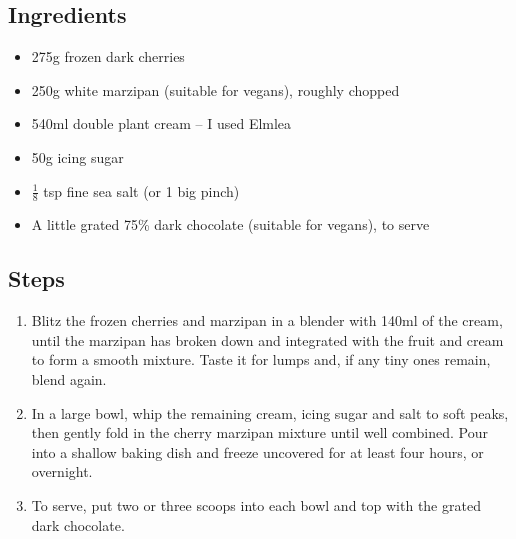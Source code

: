 \documentclass{book}
\begin{document}
\subsection*{Ingredients}
\begin{itemize}
\item 275g frozen dark cherries
\item 250g white marzipan (suitable for vegans), roughly chopped
\item 540ml double plant cream – I used Elmlea
\item 50g icing sugar
\item $\frac{1}{8}$ tsp fine sea salt (or 1 big pinch)
\item A little grated 75\% dark chocolate (suitable for vegans), to serve
\end{itemize}

\subsection*{Steps}
\begin{enumerate}
\item Blitz the frozen cherries and marzipan in a blender with 140ml of the cream, until the marzipan has broken down and integrated with the fruit and cream to form a smooth mixture. Taste it for lumps and, if any tiny ones remain, blend again.
\item In a large bowl, whip the remaining cream, icing sugar and salt to soft peaks, then gently fold in the cherry marzipan mixture until well combined. Pour into a shallow baking dish and freeze uncovered for at least four hours, or overnight.
\item To serve, put two or three scoops into each bowl and top with the grated dark chocolate.
\end{enumerate}
\newpage
\end{document}
